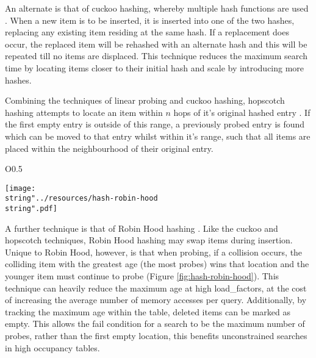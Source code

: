       An alternate is that of cuckoo hashing, whereby multiple hash functions are used \cite{PR04}. When a new item is to be inserted, it is inserted into one of the two hashes, replacing any existing item residing at the same hash. If a replacement does occur, the replaced item will be rehashed with an alternate hash and this will be repeated till no items are displaced. This technique reduces the maximum search time by locating items closer to their initial hash and scale by introducing more hashes.
      
      Combining the techniques of linear probing and cuckoo hashing, hopscotch hashing attempts to locate an item within $n$ hops of it's original hashed entry \cite{HST08}. If the first empty entry is outside of this range, a previously probed entry is found which can be moved to that entry whilst within it's range, such that all items are placed within the neighbourhood of their original entry.
\begin{wrapfigure}{O}{0.5\columnwidth}
  \begin{centering}
    \texttt{[image: \\string"../resources/hash-robin-hood\\string".pdf]}
  \par\end{centering}
  \protect\caption[A visual representation of a Robin Hood hash table that utilises linear probing.]{\label{fig:hash-robin-hood}A visual representation of a Robin Hood hash table that utilises linear probing hash from Figure \ref{fig:hash-linear-probe}.}
\end{wrapfigure}
      A further technique is that of Robin Hood hashing \cite{Cel86}. Like the cuckoo and hopscotch techniques, Robin Hood hashing may swap items during insertion. Unique to Robin Hood, however, is that when probing, if a collision occurs, the colliding item with the greatest age (the most probes) wins that location and the younger item must continue to probe (Figure \ref{fig:hash-robin-hood}). This technique can heavily reduce the maximum age at high \glspl{load_factor}, at the cost of increasing the average number of memory accesses per query. Additionally, by tracking the maximum age within the table, deleted items can be marked as empty. This allows the fail condition for a search to be the maximum number of probes, rather than the first empty location, this benefits unconstrained searches in high occupancy tables.
      
